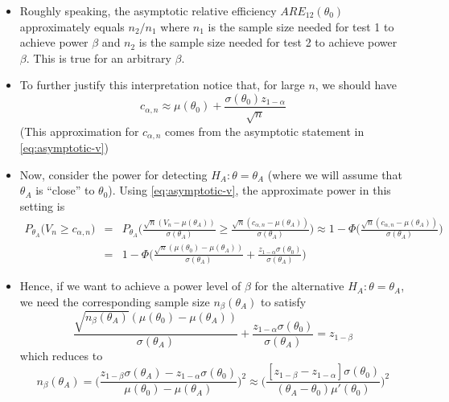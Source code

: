 \documentclass[]{book}
\begin{document}
\begin{itemize}
\item
  Roughly speaking, the asymptotic relative efficiency \(ARE_{12}( \theta_{0} )\) approximately equals
  \(n_{2}/n_{1}\) where \(n_{1}\) is the sample size needed for test 1
  to achieve power \(\beta\) and \(n_{2}\) is the sample size needed for test 2
  to achieve power \(\beta\). This is true for an arbitrary \(\beta\).
\item
  To further justify this interpretation notice that, for large \(n\), we should have
  \begin{equation}
  c_{\alpha, n} \approx \mu(\theta_{0}) + \frac{ \sigma(\theta_{0})z_{1-\alpha}  }{\sqrt{n}}
  \end{equation}
  (This approximation for \(c_{\alpha, n}\) comes from the asymptotic statement in \eqref{eq:asymptotic-v})
\item
  Now, consider the power for detecting \(H_{A}: \theta = \theta_{A}\) (where we will assume
  that \(\theta_{A}\) is ``close'' to \(\theta_{0}\)). Using \eqref{eq:asymptotic-v},
  the approximate power in this setting is
  \begin{eqnarray}
  P_{\theta_{A}}\Big( V_{n} \geq c_{\alpha, n} \Big)
  &=& P_{\theta_{A} }\Bigg( \frac{\sqrt{n}(V_{n} - \mu(\theta_{A} ))}{ \sigma(\theta_{A} )}
  \geq \frac{\sqrt{n}(c_{\alpha,n} - \mu(\theta_{A}))}{ \sigma(\theta_{A})} \Bigg)
  \approx 1 - \Phi\Bigg( \frac{\sqrt{n}(c_{\alpha,n} - \mu(\theta_{A}))}{ \sigma(\theta_{A})} \Bigg)
  \nonumber \\
  &=& 1 - \Phi\Bigg( \frac{\sqrt{n}(\mu(\theta_{0}) - \mu(\theta_{A}))}{ \sigma(\theta_{A})} + \frac{z_{1-\alpha}\sigma(\theta_{0})}{ \sigma(\theta_{A})}\Bigg)
  \end{eqnarray}
\item
  Hence, if we want to achieve a power level of \(\beta\) for the alternative \(H_{A}: \theta = \theta_{A}\),
  we need the corresponding sample size \(n_{\beta}( \theta_{A} )\) to satisfy
  \begin{equation}
  \frac{\sqrt{n_{\beta}(\theta_{A})}(\mu(\theta_{0}) - \mu(\theta_{A}))}{ \sigma(\theta_{A})} + \frac{z_{1-\alpha}\sigma(\theta_{0})}{ \sigma(\theta_{A})}
  = z_{1-\beta}
  \end{equation}
  which reduces to
  \begin{equation}
  n_{\beta}(\theta_{A})
  = \Bigg( \frac{ z_{1-\beta}\sigma(\theta_{A}) - z_{1-\alpha}\sigma(\theta_{0}) }{ \mu(\theta_{0}) - \mu(\theta_{A}) } \Bigg)^{2}
  \approx \Bigg( \frac{ [z_{1-\beta} - z_{1-\alpha}]\sigma(\theta_{0}) }{ (\theta_{A} - \theta_{0})\mu'(\theta_{0})} \Bigg)^{2}

\end{equation}
\end{itemize}
\end{document}
